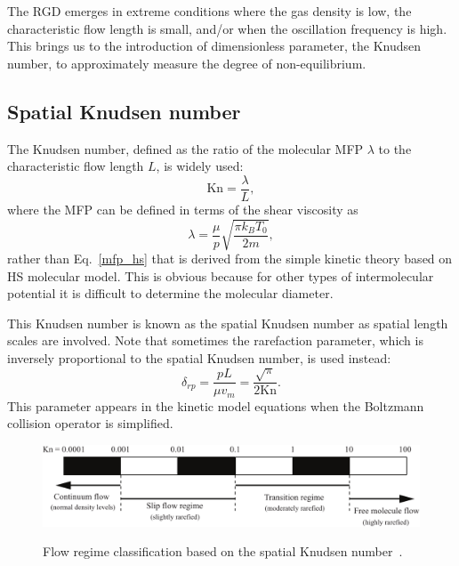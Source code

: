 The RGD emerges in extreme conditions where the gas density is low, the characteristic flow length is small, and/or when the oscillation frequency is high. This brings us to the introduction of dimensionless parameter, the Knudsen number, to approximately measure the degree of non-equilibrium. 



\subsection{Spatial Knudsen number}

The Knudsen number,  defined as the ratio of the molecular MFP $\lambda$ to the characteristic flow length $L$, is widely used:
\begin{equation}\label{Kn_original}
\text{Kn}=\frac{\lambda}{L}, 
\end{equation} 
where the MFP  can be defined in terms of the shear viscosity as
\begin{equation}
\lambda=\frac{\mu}{p}\sqrt{\frac{\pi{}k_BT_0}{2m}},
\end{equation} 
rather than Eq.~\eqref{mfp_hs} that is derived from the simple kinetic theory based on HS molecular model. This is obvious because for other types of intermolecular potential it is difficult to determine the molecular diameter. 


This Knudsen number is known as the spatial Knudsen number as spatial length scales are involved. Note that sometimes the rarefaction parameter,  which is inversely proportional to the spatial Knudsen number, is used instead:
\begin{equation}\label{rarefaction_chapter1_parameter}
\delta_{rp} =\frac{pL}{\mu{v_m}}=\frac{\sqrt{\pi}}{\text{2Kn}}.
\end{equation}
This parameter appears in the kinetic model equations when the Boltzmann collision operator is simplified. 

\begin{figure}[t]
	\centering
	\includegraphics[scale=0.7]{Introduction/IMG/Kn.pdf}\\
	\caption{
		Flow regime classification based on the spatial Knudsen number~\cite{Qian1946,Gad-el-Hak1999}.}
	\label{Kn_region}
\end{figure}

